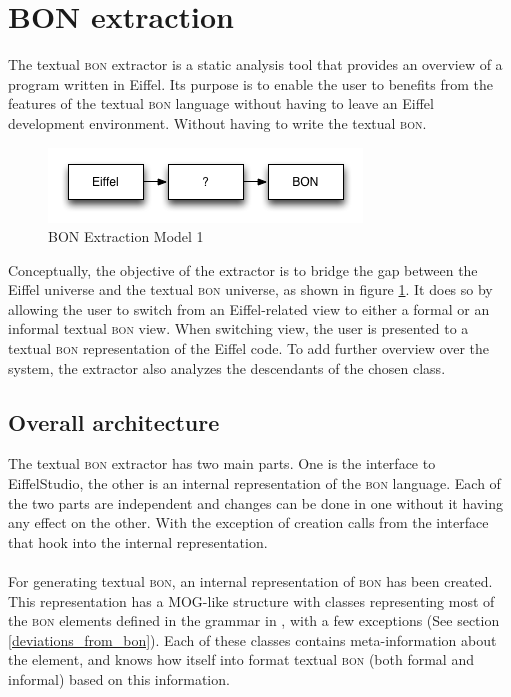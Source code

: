 \section{BON extraction}
The textual \textsc{bon} extractor is a static analysis tool that provides an overview of a program written in Eiffel. Its purpose is to enable the user to benefits from the features of the textual \textsc{bon} language without having to leave an Eiffel development environment. Without having to write the textual \textsc{bon}.
\begin{figure}[H]
\centering
\includegraphics[scale=0.8]{images/BON-extraction-model-1.png}
\caption{BON Extraction Model 1}
\label{fig:bon_extraction_1}
\end{figure}
\label{design-bon-extraction}
Conceptually, the objective of the extractor is to bridge the gap between the Eiffel universe and the textual \textsc{bon} universe, as shown in figure \ref{fig:bon_extraction_1}. It does so by allowing the user to switch from an Eiffel-related view to either a formal or an informal textual \textsc{bon} view. When switching view, the user is presented to a textual \textsc{bon} representation of the Eiffel code. To add further overview over the system, the extractor also analyzes the descendants of the chosen class.

\subsection{Overall architecture}
The textual \textsc{bon} extractor has two main parts. One is the interface to EiffelStudio, the other is an internal representation of the \textsc{bon} language. Each of the two parts are independent and changes can be done in one without it having any effect on the other. With the exception of creation calls from the interface that hook into the internal representation.

\paragraph{}
For generating textual \textsc{bon},  an internal representation of \textsc{bon} has been created. This representation has a MOG-like structure with classes representing most of the \textsc{bon} elements defined in the grammar in \cite{walden1995}, with a few exceptions (See section \ref{deviations_from_bon}).  Each of these classes contains meta-information about the element, and knows how itself into format textual \textsc{bon} (both formal and informal) based on this information.

